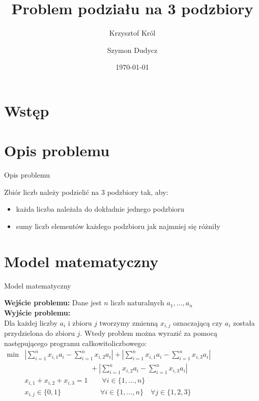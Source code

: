 \documentclass{beamer}
\title{Problem podziału na 3 podzbiory}
\author{
       Krzysztof Król\and
                Szymon Dudycz
}
\date{\today}
\begin{document}
\section{Wstęp}
\begin{frame}
  \titlepage
\end{frame}


\section{Opis problemu}

\begin{frame}{Opis problemu}

Zbiór liczb należy podzielić na 3 podzbiory tak, aby:
\begin{itemize}  
\item każda liczba należała do dokładnie jednego podzbioru
\item sumy liczb elementów każdego podzbioru jak najmniej się różniły
\end{itemize}


\end{frame}


\section{Model matematyczny}

\begin{frame}[t]{Model matematyczny}

\textbf{Wejście problemu:} Dane jest $n$ liczb naturalnych $a_1,\dots,a_n$
\\[0.1in]\textbf{Wyjście problemu:}\\ Dla każdej liczby $a_i$ i zbioru $j$ tworzymy zmienną $x_{i,j}$ oznaczającą czy $a_i$ została przydzielona do zbioru $j$. Wtedy problem można wyrazić za pomocą następującego programu całkowitoliczbowego:
\begin{equation*}
\begin{aligned}
\min &\left| \sum_{i=1}^n x_{i,1} a_i - \sum_{i=1}^n x_{i,2} a_i \right| + \left| \sum_{i=1}^n x_{i,1} a_i - \sum_{i=1}^n x_{i,3} a_i\right| \\
&\qquad\qquad\qquad\qquad\quad\:+ \left| \sum_{i=1}^n x_{i,2} a_i - \sum_{i=1}^n x_{i,3} a_i\right| \\
& x_{i,1} + x_{i,2} + x_{i,3} = 1 \quad\quad \forall i\in \{1,\dots,n\} \\
& x_{i,j} \in \{0,1\} \,\,\,\quad\qquad\qquad \forall i\in \{1,\dots,n\}\quad \forall j\in \{1,2,3\}
\end{aligned}
\phantom{\hspace{6cm}}
\end{equation*}

\end{frame}
\end{document}
